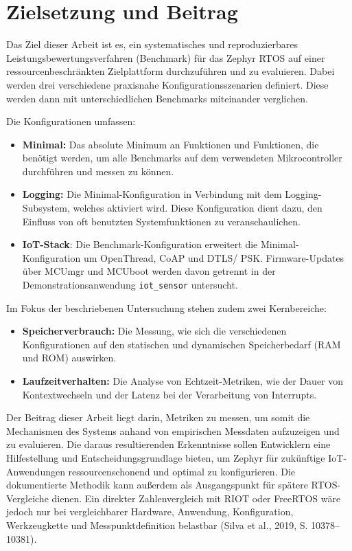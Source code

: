 \section{Zielsetzung und Beitrag}
Das Ziel dieser Arbeit ist es, ein systematisches und reproduzierbares Leistungsbewertungsverfahren (Benchmark) für das Zephyr RTOS auf einer ressourcenbeschränkten Zielplattform durchzuführen und zu evaluieren. Dabei werden drei verschiedene praxisnahe Konfigurationsszenarien definiert. Diese werden dann mit unterschiedlichen Benchmarks miteinander verglichen.

Die Konfigurationen umfassen:

\begin{itemize}
\item \textbf{Minimal: }Das absolute Minimum an Funktionen und Funktionen, die benötigt werden, um alle Benchmarks auf dem verwendeten Mikrocontroller durchführen und messen zu können.
\item \textbf{Logging: }Die Minimal-Konfiguration in Verbindung mit dem Logging-Subsystem, welches aktiviert wird. Diese Konfiguration dient dazu, den Einfluss von oft benutzten Systemfunktionen zu veranschaulichen.
\item \textbf{IoT-Stack}: Die Benchmark-Konfiguration erweitert die Minimal-Konfiguration um OpenThread, CoAP und DTLS/ PSK. Firmware-Updates über MCUmgr und MCUboot werden davon getrennt in der Demonstrationsanwendung \lstinline[style=fileinline]|iot_sensor| untersucht.
\end{itemize}
Im Fokus der beschriebenen Untersuchung stehen zudem zwei Kernbereiche:

\begin{itemize}
\item \textbf{Speicherverbrauch:} Die Messung, wie sich die verschiedenen Konfigurationen auf den statischen und dynamischen Speicherbedarf (RAM und ROM) auswirken.
\item \textbf{Laufzeitverhalten:} Die Analyse von Echtzeit-Metriken, wie der Dauer von Kontextwechseln und der Latenz bei der Verarbeitung von Interrupts.
\end{itemize}
Der Beitrag dieser Arbeit liegt darin, Metriken zu messen, um somit die Mechanismen des Systems anhand von empirischen Messdaten aufzuzeigen und zu evaluieren. Die daraus resultierenden Erkenntnisse sollen Entwicklern eine Hilfestellung und Entscheidungsgrundlage bieten, um Zephyr für zukünftige IoT-Anwendungen ressourcenschonend und optimal zu konfigurieren. Die dokumentierte Methodik kann außerdem als Ausgangspunkt für spätere RTOS-Vergleiche dienen. Ein direkter Zahlenvergleich mit RIOT oder FreeRTOS wäre jedoch nur bei vergleichbarer Hardware, Anwendung, Konfiguration, Werkzeugkette und Messpunktdefinition belastbar (Silva et al., 2019, S. 10378–10381).


